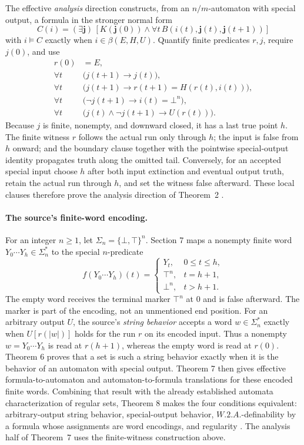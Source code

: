 The effective \emph{analysis} direction constructs, from an
\(n/m\)-automaton with special output, a formula in the stronger normal form
\[
 C(i)
 =
 (\exists\mathbf j)\,
 \left[
   K(\mathbf j(0))
   \land
   \forall t\,
   B(i(t),\mathbf j(t),\mathbf j(t+1))
 \right]
\]
with \(i\models C\) exactly when \(i\in\beta(E,H,U)\).
Quantify finite predicates \(r,j\), require \(j(0)\), and use
\[
\begin{aligned}
 r(0)&=E,\\
 \forall t\;&\bigl(j(t+1)\rightarrow j(t)\bigr),\\
 \forall t\;&\bigl(j(t+1)\rightarrow
     r(t+1)=H(r(t),i(t))\bigr),\\
 \forall t\;&\bigl(\neg j(t+1)\rightarrow i(t)=\bot^n\bigr),\\
 \forall t\;&\bigl(j(t)\land\neg j(t+1)\rightarrow U(r(t))\bigr).
\end{aligned}
\]
Because \(j\) is finite, nonempty, and downward closed, it has a last true
point \(h\).  The finite witness \(r\) follows the actual run only through
\(h\); the input is false from \(h\) onward; and the boundary clause together
with the pointwise special-output identity propagates truth along the omitted
tail.  Conversely, for an accepted special input choose \(h\) after both input
extinction and eventual output truth, retain the actual run through \(h\), and
set the witness false afterward.  These local clauses therefore prove the
analysis direction of Theorem~2
\cite[pp.~14--18, thms.~1--2]{Buchi1959WeakReport}.

\paragraph{The source's finite-word encoding.}
For an integer \(n\geq1\), let \(\Sigma_n=\{\bot,\top\}^n\).  Section 7 maps a nonempty finite word
\(Y_0\cdots Y_h\in\Sigma_n^*\) to the special \(n\)-predicate
\[
 f(Y_0\cdots Y_h)(t)
 =
 \begin{cases}
   Y_t,    &0\leq t\leq h,\\
   \top^n, &t=h+1,\\
   \bot^n, &t>h+1.
 \end{cases}
\]
The empty word receives the terminal marker \(\top^n\) at \(0\) and is false
afterward.  The marker is part of the encoding, not an unmentioned end position.
For an arbitrary output \(U\), the source's \emph{string behavior} accepts a
word \(w\in\Sigma_n^*\) exactly when \(U[r(|w|)]\) holds for the run \(r\) on
its encoded input.  Thus a nonempty \(w=Y_0\cdots Y_h\) is read at
\(r(h+1)\), whereas the empty word is read at \(r(0)\).  Theorem 6 proves that a set is
such a string behavior exactly when it is the behavior of an automaton with
special output.  Theorem 7 then gives effective formula-to-automaton and
automaton-to-formula translations for these encoded finite words.  Combining
that result with the already established automata characterization of regular
sets, Theorem 8 makes the four conditions equivalent: arbitrary-output string
behavior, special-output behavior, \(W.2.A.\)-definability by a formula whose
assignments are word encodings, and regularity
\cite[pp.~30--34, thms.~6--8]{Buchi1959WeakReport}.
The analysis half of Theorem~7 uses the finite-witness construction above.

